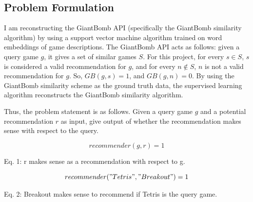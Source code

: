 \documentclass[10pt,twocolumn]{article}
\begin{document}

\subsection{Problem Formulation}

I am reconstructing the GiantBomb API \cite{GiantBomb} (specifically the GiantBomb similarity algorithm) by using a support vector machine algorithm trained on word embeddings of game descriptions. The GiantBomb API acts as follows: given a query game $g$, it gives a set of similar games $S$. For this project, for every $s \in S$, $s$ is considered a valid recommendation for $g$, and for every $n \not\in S$, $n$ is not a valid recommendation for $g$. So, $GB(g, s) = 1$, and $GB(g, n) = 0$. By using the GiantBomb similarity scheme as the ground truth data, the supervised learning algorithm reconstructs the GiantBomb similarity algorithm.

Thus, the problem statement is as follows. Given a query game $g$ and a potential recommendation $r$ as input, give output of whether the recommendation makes sense with respect to the query. 

\begin{equation}
    recommender(g, r) = 1
\end{equation}

Eq. 1: r makes sense as a recommendation with respect to g.

\begin{equation}
    recommender("Tetris", "Breakout") = 1
\end{equation}

Eq. 2: Breakout makes sense to recommend if Tetris is the query game.
\end{document}

